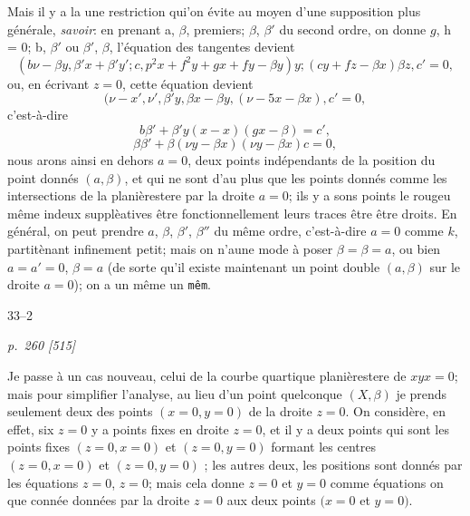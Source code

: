 \documentclass[11pt,a4paper]{article}
\theoremstyle{plain}
\theoremstyle{definition}
\begin{document}
Mais il y a la une restriction qui'on \'evite au moyen d'une supposition plus g\'en\'erale,
\textit{savoir}: en prenant a, $\beta$, premiers; $\beta$, $\beta'$ du second ordre, on donne $g$, h = 0; b, $\beta'$ ou $\beta'$, $\beta$,
l'\'equation des tangentes devient
\[
(b\nu - \beta y, \beta' x + \beta' y'; c, p^2x + f^2y + gx + fy - \beta y)y; (cy + fz - \beta x)\beta z, c' = 0,
\]
ou, en \'ecrivant $z = 0$, cette \'equation devient
\[
(\nu - x', \nu', \beta' y, \beta x - \beta y, (\nu - 5x - \beta x), c' = 0,
\]
c'est-\`a-dire
\[
b\beta' + \beta' y(x - x)(gx - \beta) = c',
\]
\[
\beta\beta' + \beta(\nu y - \beta x)(\nu y - \beta x)c = 0,
\]
nous arons ainsi en dehors $a = 0$, deux points ind\'ependants de la position du point
donn\'es $(a, \beta)$, et qui ne sont d'au plus que les points donn\'es comme les intersections de la
plani\`erestere par la droite $a = 0$; ils y a sons points le rougeu m\^eme indeux suppl\`eatives
\^etre fonctionnellement leurs traces \^etre \^etre droits.  En g\'en\'eral, on peut prendre $a$, $\beta$, $\beta'$, $\beta''$ du m\^eme ordre, c'est-\`a-dire
$a = 0$ comme $k$, partit\`enant infinement petit; mais on n'aune mode \`a poser $\beta = \beta = a$, ou bien $a = a' = 0$, $\beta = a$ (de sorte qu'il
existe maintenant un point double $(a, \beta)$ sur le droite $a = 0$); on a un m\^eme un \texttt{m\^em}.

\hfill 33--2

\clearpage

\bigskip
\textit{p.~260 [515]}
\smallskip

Je passe \`a un cas nouveau, celui de la courbe quartique plani\`erestere de $xyx = 0$;
mais pour simplifier l'analyse, au lieu d'un point quelconque $(X, \beta)$ je prends seulement deux des points $(x = 0, y = 0)$ de la droite $z = 0$.  On consid\`ere, en effet, six $z = 0$
y a points fixes en droite $z = 0$, et il y a deux points qui sont les points fixes $(z = 0, x = 0)$ et
$(z = 0, y = 0)$ formant les centres $(z = 0, x = 0)$ et $(z = 0, y = 0)$ ; les autres deux, les positions
sont donn\'es par les \'equations $z = 0$, $z = 0$; mais cela donne $z = 0$ et $y = 0$ comme \'equations
on que conn\'ee donn\'ees par la droite $z = 0$ aux deux points $(x = 0$ et $y = 0)$.
\end{document}

